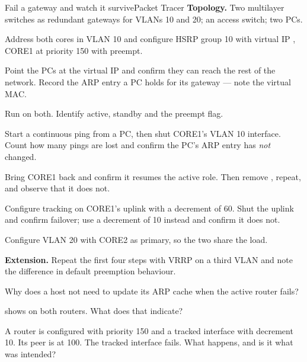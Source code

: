 \begin{lab}{Fail a gateway and watch it survive}{Packet Tracer}
\textbf{Topology.} Two multilayer switches as redundant gateways for VLANs 10 and
20; an access switch; two PCs.

\begin{tasks}
  \item Address both cores in VLAN 10 and configure HSRP group 10 with virtual IP
        , CORE1 at priority 150 with preempt.
  \item Point the PCs at the virtual IP and confirm they can reach the rest of the
        network. Record the ARP entry a PC holds for its gateway --- note the
        virtual MAC.
  \item Run  on both. Identify active, standby and the
        preempt flag.
  \item Start a continuous ping from a PC, then shut CORE1's VLAN 10 interface.
        Count how many pings are lost and confirm the PC's ARP entry has
        \emph{not} changed.
  \item Bring CORE1 back and confirm it resumes the active role. Then remove
        , repeat, and observe that it does not.
  \item Configure tracking on CORE1's uplink with a decrement of 60. Shut the
        uplink and confirm failover; use a decrement of 10 instead and confirm it
        does not.
  \item Configure VLAN 20 with CORE2 as primary, so the two share the load.
  \item \textbf{Extension.} Repeat the first four steps with VRRP on a third VLAN
        and note the difference in default preemption behaviour.
\end{tasks}
\end{lab}

\begin{checkpoint}
\begin{tightnum}
  \item Why does a host not need to update its ARP cache when the active router
        fails?
  \item {} shows  on both routers.
        What does that indicate?
  \item A router is configured with priority 150 and a tracked interface with
        decrement 10. Its peer is at 100. The tracked interface fails. What
        happens, and is it what was intended?
\end{tightnum}
\end{checkpoint}

